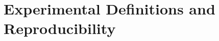 \documentclass{article}
\begin{document}

\clearpage

\section{Experimental Definitions and Reproducibility}\label{app:method-details}
\end{document}

